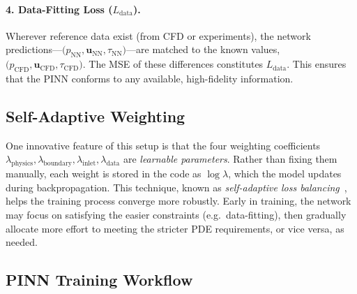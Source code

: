 \documentclass[12pt, a4paper]{article}
\begin{document}
\paragraph{4. Data-Fitting Loss (\(L_{\mathrm{data}}\)).}
Wherever reference data exist (from CFD or experiments), the network
predictions---\(\bigl(p_{\mathrm{NN}}, \mathbf{u}_{\mathrm{NN}},
\tau_{\mathrm{NN}}\bigr)\)---are matched to the known values,
\(\bigl(p_{\mathrm{CFD}}, \mathbf{u}_{\mathrm{CFD}},
\tau_{\mathrm{CFD}}\bigr)\). The MSE of these differences constitutes
\(L_{\mathrm{data}}\). This ensures that the PINN conforms to any available,
high-fidelity information.

\subsection{Self-Adaptive Weighting}
\label{sec:SelfAdaptive}

One innovative feature of this setup is that the four weighting coefficients
\(\lambda_{\mathrm{physics}}, \lambda_{\mathrm{boundary}}, 
\lambda_{\mathrm{inlet}}, \lambda_{\mathrm{data}}\) are \emph{learnable
parameters}. Rather than fixing them manually, each weight is stored in the code
as \(\log \lambda\), which the model updates during backpropagation. This
technique, known as \emph{self-adaptive loss balancing}~\citep{mcclenny2020self},
helps the training process converge more robustly. Early in training, the network
may focus on satisfying the easier constraints (e.g.\ data-fitting), then gradually
allocate more effort to meeting the stricter PDE requirements, or vice versa, as
needed.

\subsection{PINN Training Workflow}
\label{sec:PINN_Training}
\end{document}
